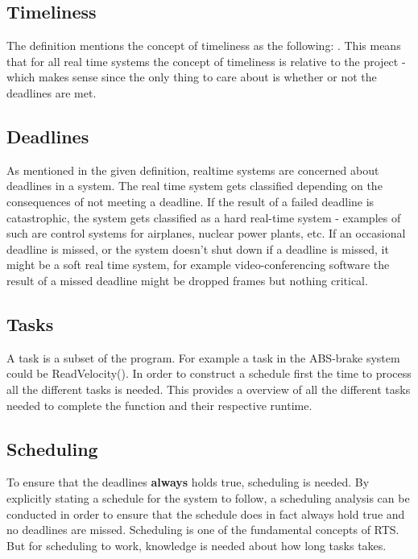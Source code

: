 \subsection{Timeliness}
The definition mentions the concept of timeliness as the following:
. This means that for all real time systems the concept of
timeliness is relative to the project - which makes sense since the only thing
to care about is whether or not the deadlines are met.

\subsection{Deadlines}
As mentioned in the given definition, realtime systems are concerned about
deadlines in a system.
The real time system gets classified depending on the consequences of not
meeting a deadline. If the result of a failed deadline is catastrophic, the
system gets classified as a hard real-time system - examples of such are control
systems for airplanes, nuclear power plants, etc.
If an occasional deadline is missed, or the system doesn't shut down if a
deadline is missed, it might be a soft real time system, for example
video-conferencing software the result of a missed deadline might be dropped
frames but nothing critical.

\subsection{Tasks}
A task is a subset of the program. For example a task in the ABS-brake system
could be ReadVelocity(). In order to construct a schedule first the time to
process all the different tasks is needed. This provides a overview of all the
different tasks needed to complete the function and their respective runtime.

\subsection{Scheduling}
To ensure that the deadlines \textbf{always} holds true, scheduling is needed.
By explicitly stating a schedule for the system to follow, a scheduling analysis
can be conducted in order to ensure that the schedule does in fact always hold
true and no deadlines are missed. Scheduling is one of the
fundamental concepts of RTS. But for scheduling to work, knowledge is needed
about how long tasks takes. 
